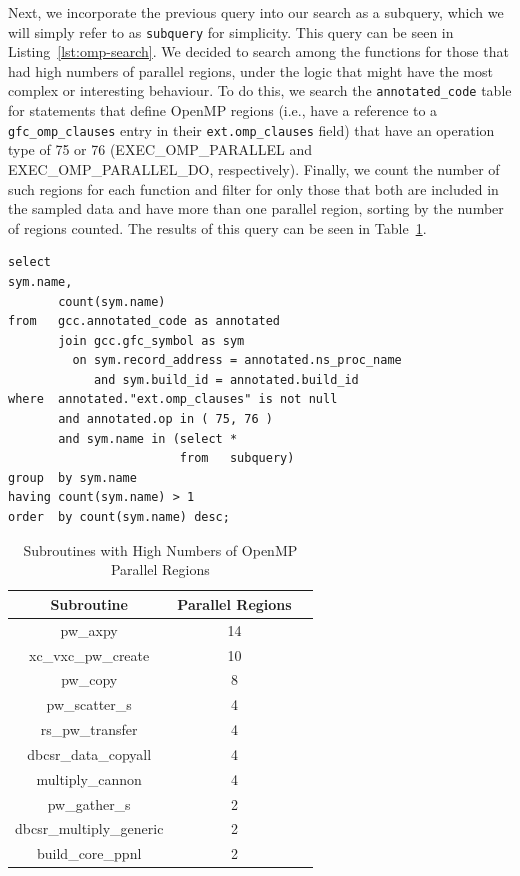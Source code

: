 Next, we incorporate the previous query into our search as a subquery, which we will simply refer to 
as \texttt{subquery} for simplicity.
This query can be seen in Listing~\ref{lst:omp-search}.
We decided to search among the functions for those that had high numbers of parallel regions, under 
the logic that might have the most complex or interesting behaviour.
To do this, we search the \texttt{annotated\_code} table for statements that define OpenMP regions 
(i.e., have a reference to a \texttt{gfc\_omp\_clauses} entry in their \texttt{ext.omp\_clauses} field) 
that have an operation type of 75 or 76 (EXEC\_OMP\_PARALLEL and 
EXEC\_OMP\_PARALLEL\_DO, respectively).
Finally, we count the number of such regions for each function and filter for only those that both are 
included in the sampled data and have more than one parallel region, sorting by the number of 
regions counted.
The results of this query can be seen in Table~\ref{tbl:parallel-regions}.

\begin{lstlisting}[caption=Finding High Concentrations of OpenMP Parallel Regions, 
label=lst:omp-search]
select 
sym.name,
       count(sym.name)
from   gcc.annotated_code as annotated
       join gcc.gfc_symbol as sym
         on sym.record_address = annotated.ns_proc_name
            and sym.build_id = annotated.build_id
where  annotated."ext.omp_clauses" is not null
       and annotated.op in ( 75, 76 )
       and sym.name in (select *
                        from   subquery)
group  by sym.name
having count(sym.name) > 1
order  by count(sym.name) desc;  
\end{lstlisting}

\begin{table}[htbp]
\caption{Subroutines with High Numbers of OpenMP Parallel Regions}
\begin{center}
\begin{tabular}{|c|c|c|}
\hline
\textbf{Subroutine} & \textbf{Parallel Regions} \\
\hline
pw\_axpy & 14 \\
\hline
xc\_vxc\_pw\_create & 10 \\
\hline
pw\_copy & 8 \\
\hline
pw\_scatter\_s & 4 \\
\hline
rs\_pw\_transfer & 4 \\
\hline
dbcsr\_data\_copyall & 4 \\
\hline
multiply\_cannon & 4 \\
\hline
pw\_gather\_s & 2 \\
\hline
dbcsr\_multiply\_generic & 2 \\
\hline
build\_core\_ppnl & 2 \\
\hline
\end{tabular}
\label{tbl:parallel-regions}
\end{center}
\end{table}

